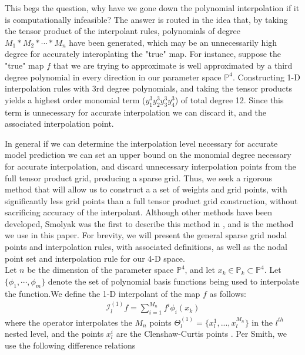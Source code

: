 \documentclass{article}
\begin{document}
This begs the question, why have we gone down the polynomial interpolation if it is computationally infeasible? The answer is routed in the idea that, by taking the tensor product of the interpolant rules, polynomials of degree $M_1*M_2*\cdots *M_n$ have been generated, which may be an unnecessarily high degree for accurately interoplating the "true" map. For instance, suppose the "true" map $f$ that we are trying to approximate is well approximated by a third degree polynomial in every direction in our parameter space $\mathbb{P}^4$. Constructing 1-D interpolation rules with 3rd degree polynomials, and taking the tensor products yields a highest order monomial term ($y_1^3y_2^3y_3^3y_4^3$)  of total degree  12. Since this term is unnecessary for accurate interpolation we can discard it, and the associated interpolation point.\\

\vspace{0.01cm}

In general if we can determine the interpolation level necessary for accurate model prediction we can set an upper bound on the monomial degree necessary for accurate interpolation, and discard unnecessary interpolation points from the full tensor product grid, producing a sparse grid. Thus, we seek a rigorous method that will allow us to construct a a set of weights and grid points, with significantly less grid points than a full tensor product grid construction, without sacrificing accuracy of the interpolant. Although other methods have been developed, Smolyak was the first to describe this method in \cite{Smolyak},  and is the method we use in this paper. For brevity, we will present the general sparse grid nodal points and interpolation rules, with associated definitions, as well as the nodal point set and interpolation rule for our 4-D space.\\

\vspace{0.01cm}
Let $n$ be the dimension of the parameter space $\mathbb{P}^4$, and let  $x_k \in \mathbb{P}_k \subset \mathbb{P}^4$. Let $\{\phi_1,\cdots, \phi_m\}$ denote the set of polynomial basis functions being used to interpolate the function.We define the 1-D interpolant of the map $f$ as follows:
\begin{align*}
\mathcal{I}_l^{(1)}f = \sum_{i=1}^{M_n} f^i\phi_i(x_k)
\end{align*}
where the operator interpolates the $M_n$ points $\Theta_l^{(1)} = \{x_l^1, ..., x_l^{M_n} \}$ in the $l^{th}$ nested level, and the points $x_l^i$ are the Clenshaw-Curtis points \cite{R_Smith}. Per Smith, \cite{R_Smith} we use the following difference relations
\end{document}
